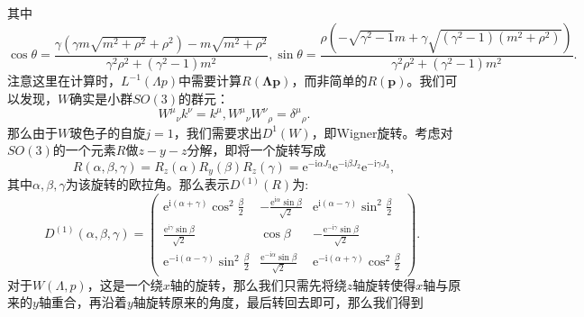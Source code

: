 其中
\begin{equation*}
	\cos \theta =\frac{\gamma \left( \gamma m\sqrt{m^{2} +\rho ^{2}} +\rho ^{2}\right) -m\sqrt{m^{2} +\rho ^{2}}}{\gamma ^{2} \rho ^{2} +\left( \gamma ^{2} -1\right) m^{2}} ,\sin \theta =\frac{\rho \left( -\sqrt{\gamma ^{2} -1} m+\gamma \sqrt{\left( \gamma ^{2} -1\right)\left( m^{2} +\rho ^{2}\right)}\right)}{\gamma ^{2} \rho ^{2} +\left( \gamma ^{2} -1\right) m^{2}} .
\end{equation*}
注意这里在计算时，$L^{-1}( \Lambda p)$中需要计算$R(\mathbf{\Lambda }\boldsymbol{p})$，而非简单的$R(\boldsymbol{p})$。我们可以发现，$W$确实是小群$SO( 3)$的群元：
\begin{equation*}
	W^{\mu }{}_{\nu } k^{\nu } =k^{\mu } ,W^{\mu }{}_{\nu } W^{\nu }{}_{\rho } =\delta ^{\mu }{}_{\rho } .
\end{equation*}
那么由于$W$玻色子的自旋$j=1$，我们需要求出$D^{1}( W)$，即Wigner旋转。考虑对$SO( 3)$的一个元素$R$做$z-y-z$分解，即将一个旋转写成
\begin{equation*}
	R( \alpha ,\beta ,\gamma ) =R_{z}( \alpha ) R_{y}( \beta ) R_{z}( \gamma ) =\mathrm{e}^{-\mathrm{i} \alpha J_{3}}\mathrm{e}^{-\mathrm{i} \beta J_{2}}\mathrm{e}^{-\mathrm{i} \gamma J_{3}} ,
\end{equation*}
其中$\alpha ,\beta ,\gamma $为该旋转的欧拉角。那么表示$D^{( 1)}( R)$为:
\begin{equation*}
	D^{( 1)} (\alpha ,\beta ,\gamma )=\left(\begin{matrix}
		\mathrm{e}^{\mathrm{i} (\alpha +\gamma )}\cos^{2}\frac{\beta }{2} & -\frac{\mathrm{e}^{\mathrm{i} \alpha }\sin \beta }{\sqrt{2}} & \mathrm{e}^{\mathrm{i} (\alpha -\gamma )}\sin^{2}\frac{\beta }{2}\\
		\frac{\mathrm{e}^{\mathrm{i} \gamma }\sin \beta }{\sqrt{2}} & \cos \beta  & -\frac{\mathrm{e}^{-\mathrm{i} \gamma }\sin \beta }{\sqrt{2}}\\
		\mathrm{e}^{-\mathrm{i} (\alpha -\gamma )}\sin^{2}\frac{\beta }{2} & \frac{\mathrm{e}^{-\mathrm{i} \alpha }\sin \beta }{\sqrt{2}} & \mathrm{e}^{-\mathrm{i} (\alpha +\gamma )}\cos^{2}\frac{\beta }{2}
	\end{matrix}\right)\text{. }
\end{equation*}
对于$W( \Lambda ,p)$，这是一个绕$x$轴的旋转，那么我们只需先将绕$z$轴旋转使得$x$轴与原来的$y$轴重合，再沿着$y$轴旋转原来的角度，最后转回去即可，那么我们得到
